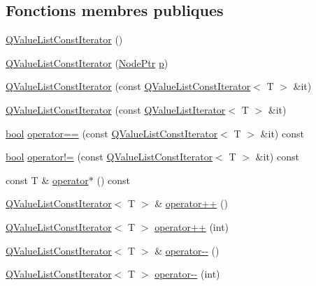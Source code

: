 \subsection*{Fonctions membres publiques}
\begin{DoxyCompactItemize}
\item 
\hyperlink{class_q_value_list_const_iterator_adc6d0a8fab8a6d737806fdee6537ac61}{Q\+Value\+List\+Const\+Iterator} ()
\item 
\hyperlink{class_q_value_list_const_iterator_a5b5e0445e43be3c76047d39e314a97d2}{Q\+Value\+List\+Const\+Iterator} (\hyperlink{class_q_value_list_const_iterator_a2416aa81d7180a7e83fd7ddc334ec5d1}{Node\+Ptr} \hyperlink{060__command__switch_8tcl_a15229b450f26d8fa1c10bea4f3279f4d}{p})
\item 
\hyperlink{class_q_value_list_const_iterator_a3266d20d3b41cdd6a5bccec0c313121e}{Q\+Value\+List\+Const\+Iterator} (const \hyperlink{class_q_value_list_const_iterator}{Q\+Value\+List\+Const\+Iterator}$<$ T $>$ \&it)
\item 
\hyperlink{class_q_value_list_const_iterator_a364e64002620ddb7946fa3f0a172b4c1}{Q\+Value\+List\+Const\+Iterator} (const \hyperlink{class_q_value_list_iterator}{Q\+Value\+List\+Iterator}$<$ T $>$ \&it)
\item 
\hyperlink{qglobal_8h_a1062901a7428fdd9c7f180f5e01ea056}{bool} \hyperlink{class_q_value_list_const_iterator_a4f4ec9cf2c17b043828173989b3cbced}{operator==} (const \hyperlink{class_q_value_list_const_iterator}{Q\+Value\+List\+Const\+Iterator}$<$ T $>$ \&it) const 
\item 
\hyperlink{qglobal_8h_a1062901a7428fdd9c7f180f5e01ea056}{bool} \hyperlink{class_q_value_list_const_iterator_abde488755aa3a7ca267c5d89c65d0dbc}{operator!=} (const \hyperlink{class_q_value_list_const_iterator}{Q\+Value\+List\+Const\+Iterator}$<$ T $>$ \&it) const 
\item 
const T \& \hyperlink{class_q_value_list_const_iterator_aa507798106704a61dc80d58789e6fee8}{operator$\ast$} () const 
\item 
\hyperlink{class_q_value_list_const_iterator}{Q\+Value\+List\+Const\+Iterator}$<$ T $>$ \& \hyperlink{class_q_value_list_const_iterator_af7b222211b620d4bf54e7a6768de3129}{operator++} ()
\item 
\hyperlink{class_q_value_list_const_iterator}{Q\+Value\+List\+Const\+Iterator}$<$ T $>$ \hyperlink{class_q_value_list_const_iterator_a1694114389ea175cc6ffb4b04789e43c}{operator++} (int)
\item 
\hyperlink{class_q_value_list_const_iterator}{Q\+Value\+List\+Const\+Iterator}$<$ T $>$ \& \hyperlink{class_q_value_list_const_iterator_a3fefc8d7db8d64363aa2a780fbb5fa38}{operator-\/-\/} ()
\item 
\hyperlink{class_q_value_list_const_iterator}{Q\+Value\+List\+Const\+Iterator}$<$ T $>$ \hyperlink{class_q_value_list_const_iterator_a1004c5add9309565fee043053bca92b9}{operator-\/-\/} (int)
\end{DoxyCompactItemize}
